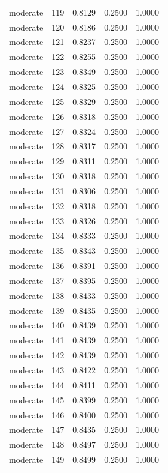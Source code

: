 \begin{tabular}{lrrrr}
moderate & 119 & 0.8129 & 0.2500 & 1.0000 \\
moderate & 120 & 0.8186 & 0.2500 & 1.0000 \\
moderate & 121 & 0.8237 & 0.2500 & 1.0000 \\
moderate & 122 & 0.8255 & 0.2500 & 1.0000 \\
moderate & 123 & 0.8349 & 0.2500 & 1.0000 \\
moderate & 124 & 0.8325 & 0.2500 & 1.0000 \\
moderate & 125 & 0.8329 & 0.2500 & 1.0000 \\
moderate & 126 & 0.8318 & 0.2500 & 1.0000 \\
moderate & 127 & 0.8324 & 0.2500 & 1.0000 \\
moderate & 128 & 0.8317 & 0.2500 & 1.0000 \\
moderate & 129 & 0.8311 & 0.2500 & 1.0000 \\
moderate & 130 & 0.8318 & 0.2500 & 1.0000 \\
moderate & 131 & 0.8306 & 0.2500 & 1.0000 \\
moderate & 132 & 0.8318 & 0.2500 & 1.0000 \\
moderate & 133 & 0.8326 & 0.2500 & 1.0000 \\
moderate & 134 & 0.8333 & 0.2500 & 1.0000 \\
moderate & 135 & 0.8343 & 0.2500 & 1.0000 \\
moderate & 136 & 0.8391 & 0.2500 & 1.0000 \\
moderate & 137 & 0.8395 & 0.2500 & 1.0000 \\
moderate & 138 & 0.8433 & 0.2500 & 1.0000 \\
moderate & 139 & 0.8435 & 0.2500 & 1.0000 \\
moderate & 140 & 0.8439 & 0.2500 & 1.0000 \\
moderate & 141 & 0.8439 & 0.2500 & 1.0000 \\
moderate & 142 & 0.8439 & 0.2500 & 1.0000 \\
moderate & 143 & 0.8422 & 0.2500 & 1.0000 \\
moderate & 144 & 0.8411 & 0.2500 & 1.0000 \\
moderate & 145 & 0.8399 & 0.2500 & 1.0000 \\
moderate & 146 & 0.8400 & 0.2500 & 1.0000 \\
moderate & 147 & 0.8435 & 0.2500 & 1.0000 \\
moderate & 148 & 0.8497 & 0.2500 & 1.0000 \\
moderate & 149 & 0.8499 & 0.2500 & 1.0000 \\

\end{tabular}
